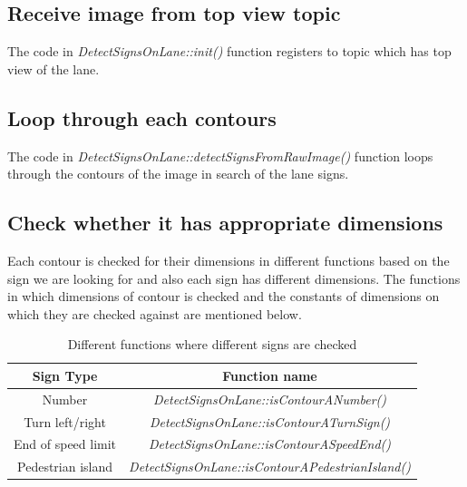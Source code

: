 \subsection{Receive image from top view topic}
\label{subsec:RecieveImageFromTopView}
The code in \emph{DetectSignsOnLane::init()} function registers to topic which has top view of the lane.

\subsection{Loop through each contours}
\label{subsec:LoopThroughContours}
The code in \emph{DetectSignsOnLane::detectSignsFromRawImage()} function loops through the contours of the image in search of the lane signs.

\subsection{Check whether it has appropriate dimensions}
Each contour is checked for their dimensions in different functions based on the sign we are looking for and also each sign has different dimensions. The functions in which dimensions of contour is checked and the constants of dimensions on which they are checked against are mentioned below.
\begin{table}[h!]
\centering
\begin{tabular}{|c|c|}
\hline
    Sign Type & Function name\\
\hline
    Number &  \small{\emph{DetectSignsOnLane::isContourANumber()}}\\
    Turn left/right &  \small{\emph{DetectSignsOnLane::isContourATurnSign()}}\\
    End of speed limit &  \small{\emph{DetectSignsOnLane::isContourASpeedEnd()}}\\
    Pedestrian island &  \small{\emph{DetectSignsOnLane::isContourAPedestrianIsland()}}\\
\hline
\end{tabular}
\caption{Different functions where different signs are checked}
\end{table}
    
